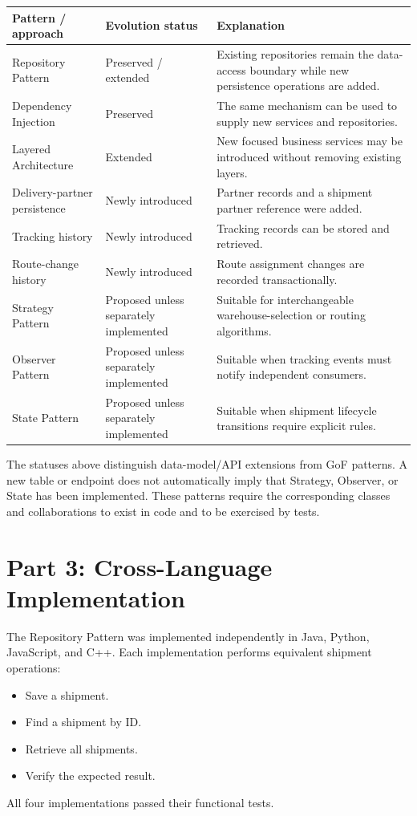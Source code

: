 \documentclass[12pt,a4paper]{article}
\begin{document}
\begin{longtable}{p{}p{}p{}}
\toprule
\textbf{Pattern / approach} & \textbf{Evolution status} & \textbf{Explanation}\\
\midrule
Repository Pattern & Preserved / extended & Existing repositories remain the data-access boundary while new persistence operations are added.\\
Dependency Injection & Preserved & The same mechanism can be used to supply new services and repositories.\\
Layered Architecture & Extended & New focused business services may be introduced without removing existing layers.\\
Delivery-partner persistence & Newly introduced & Partner records and a shipment partner reference were added.\\
Tracking history & Newly introduced & Tracking records can be stored and retrieved.\\
Route-change history & Newly introduced & Route assignment changes are recorded transactionally.\\
Strategy Pattern & Proposed unless separately implemented & Suitable for interchangeable warehouse-selection or routing algorithms.\\
Observer Pattern & Proposed unless separately implemented & Suitable when tracking events must notify independent consumers.\\
State Pattern & Proposed unless separately implemented & Suitable when shipment lifecycle transitions require explicit rules.\\
\bottomrule
\end{longtable}

The statuses above distinguish data-model/API extensions from GoF patterns. A new table or endpoint does not automatically imply that Strategy, Observer, or State has been implemented. These patterns require the corresponding classes and collaborations to exist in code and to be exercised by tests.

\section{Part 3: Cross-Language Implementation}
The Repository Pattern was implemented independently in Java, Python, JavaScript, and C++. Each implementation performs equivalent shipment operations:
\begin{itemize}
    \item Save a shipment.
    \item Find a shipment by ID.
    \item Retrieve all shipments.
    \item Verify the expected result.
\end{itemize}
All four implementations passed their functional tests.
\end{document}
